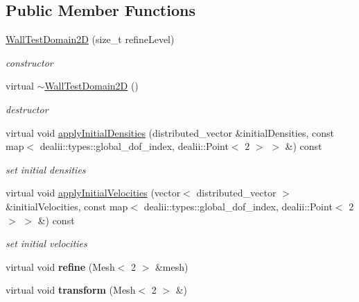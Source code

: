 \subsection*{Public Member Functions}
\begin{DoxyCompactItemize}
\item 
\hyperlink{classWallTestDomain2D_ae2a5588bd00b23f67587f5030520daca}{WallTestDomain2D} (size\_\-t refineLevel)
\begin{DoxyCompactList}\small\item\em constructor \item\end{DoxyCompactList}\item 
\hypertarget{classWallTestDomain2D_af086a6015fed51c4e1bd14e39fa52971}{
virtual \hyperlink{classWallTestDomain2D_af086a6015fed51c4e1bd14e39fa52971}{$\sim$WallTestDomain2D} ()}
\label{classWallTestDomain2D_af086a6015fed51c4e1bd14e39fa52971}

\begin{DoxyCompactList}\small\item\em destructor \item\end{DoxyCompactList}\item 
virtual void \hyperlink{classWallTestDomain2D_af8d57a6c29029514a2f2d09547f7fba1}{applyInitialDensities} (distributed\_\-vector \&initialDensities, const map$<$ dealii::types::global\_\-dof\_\-index, dealii::Point$<$ 2 $>$ $>$ \&) const 
\begin{DoxyCompactList}\small\item\em set initial densities \item\end{DoxyCompactList}\item 
virtual void \hyperlink{classWallTestDomain2D_ad2f712c227bc9ada17002006e90de3a1}{applyInitialVelocities} (vector$<$ distributed\_\-vector $>$ \&initialVelocities, const map$<$ dealii::types::global\_\-dof\_\-index, dealii::Point$<$ 2 $>$ $>$ \&) const 
\begin{DoxyCompactList}\small\item\em set initial velocities \item\end{DoxyCompactList}\item 
\hypertarget{classWallTestDomain2D_a5d7fbb94be87a914c46813eb0782f2f8}{
virtual void {\bfseries refine} (Mesh$<$ 2 $>$ \&mesh)}
\label{classWallTestDomain2D_a5d7fbb94be87a914c46813eb0782f2f8}

\item 
\hypertarget{classWallTestDomain2D_a66a7a884d0abd4c23144892bd9ff2fc9}{
virtual void {\bfseries transform} (Mesh$<$ 2 $>$ \&)}
\label{classWallTestDomain2D_a66a7a884d0abd4c23144892bd9ff2fc9}

\end{DoxyCompactItemize}


